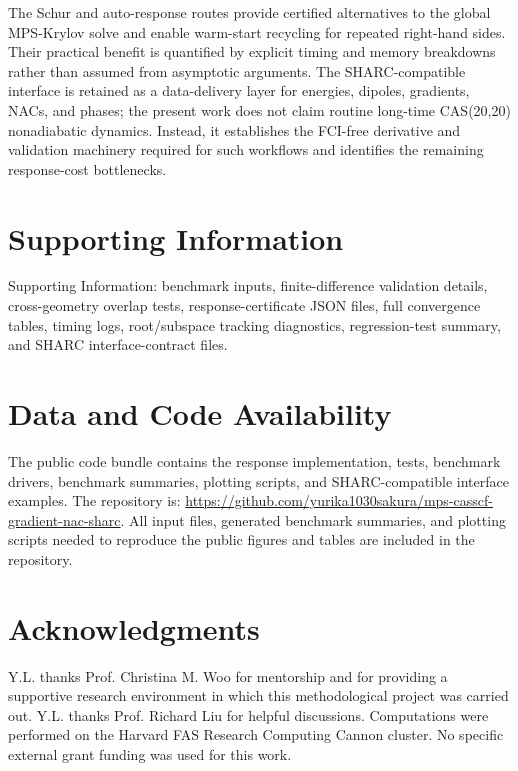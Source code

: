 \documentclass[journal=jctcce,manuscript=article]{achemso}
\begin{document}
The Schur and auto-response routes provide certified alternatives to the global MPS-Krylov solve and enable warm-start recycling for repeated right-hand sides.
Their practical benefit is quantified by explicit timing and memory breakdowns rather than assumed from asymptotic arguments.
The SHARC-compatible interface is retained as a data-delivery layer for energies, dipoles, gradients, NACs, and phases; the present work does not claim routine long-time CAS(20,20) nonadiabatic dynamics.
Instead, it establishes the FCI-free derivative and validation machinery required for such workflows and identifies the remaining response-cost bottlenecks.

\section*{Supporting Information}
Supporting Information: benchmark inputs, finite-difference validation details, cross-geometry overlap tests, response-certificate JSON files, full convergence tables, timing logs, root/subspace tracking diagnostics, regression-test summary, and SHARC interface-contract files.

\section*{Data and Code Availability}
The public code bundle contains the response implementation, tests, benchmark drivers, benchmark summaries, plotting scripts, and SHARC-compatible interface examples.
The repository is: {\small\url{https://github.com/yurika1030sakura/mps-casscf-gradient-nac-sharc}.}
All input files, generated benchmark summaries, and plotting scripts needed to reproduce the public figures and tables are included in the repository.

\section*{Acknowledgments}
Y.L. thanks Prof. Christina M. Woo for mentorship and for providing a supportive research environment in which this methodological project was carried out.
Y.L. thanks Prof. Richard Liu for helpful discussions.
Computations were performed on the Harvard FAS Research Computing Cannon cluster.
No specific external grant funding was used for this work.


\end{document}
